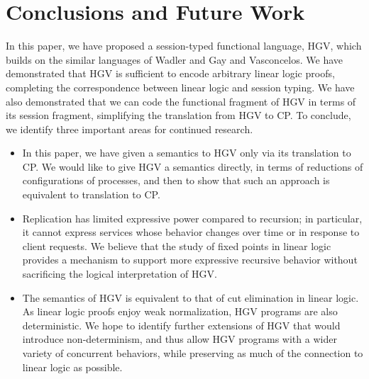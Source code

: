 \documentclass{easychair}
\makeatletter
\newcommand{\ba}{\begin{array}}
\newcommand{\ea}{\end{array}}
\newenvironment{equations}{\[\ba{@{}r@{~}c@{~}l@{}}}{\ea\]}
\newcommand{\cpj}[2]{{#1} \vdash {#2}}
\newcommand{\gvj}[3]{{#1} \vdash {#2} : {#3}}
\newcommand{\cpDual}[1]{{#1}^\bot}
\newcommand{\hgv}{HGV\xspace}
\newcommand{\hgvcp}[1]{\llbracket{#1}\rrbracket}
\makeatother
\begin{document}



\section{Conclusions and Future Work}

In this paper, we have proposed a session-typed functional language, \hgv, which builds on the
similar languages of Wadler and Gay and Vasconcelos.  We have demonstrated that \hgv is sufficient
to encode arbitrary linear logic proofs, completing the correspondence between linear logic and
session typing.  We have also demonstrated that we can code the functional fragment of \hgv in terms
of its session fragment, simplifying the translation from \hgv to CP.  To conclude, we identify
three important areas for continued research.
\begin{itemize}
\item In this paper, we have given a semantics to \hgv only via its translation to CP.  We would
  like to give \hgv a semantics directly, in terms of reductions of configurations of processes, and
  then to show that such an approach is equivalent to translation to CP.
\item Replication has limited expressive power compared to recursion; in particular, it cannot
  express services whose behavior changes over time or in response to client requests.  We believe
  that the study of fixed points in linear logic provides a mechanism to support more expressive
  recursive behavior without sacrificing the logical interpretation of \hgv.
\item The semantics of \hgv is equivalent to that of cut elimination in linear logic.  As linear
  logic proofs enjoy weak normalization, \hgv programs are also deterministic.  We hope to identify
  further extensions of \hgv that would introduce non-determinism, and thus allow \hgv programs with
  a wider variety of concurrent behaviors, while preserving as much of the connection to linear
  logic as possible.
\end{itemize}





\label{sect:bib}

%
%
%

\end{document}
